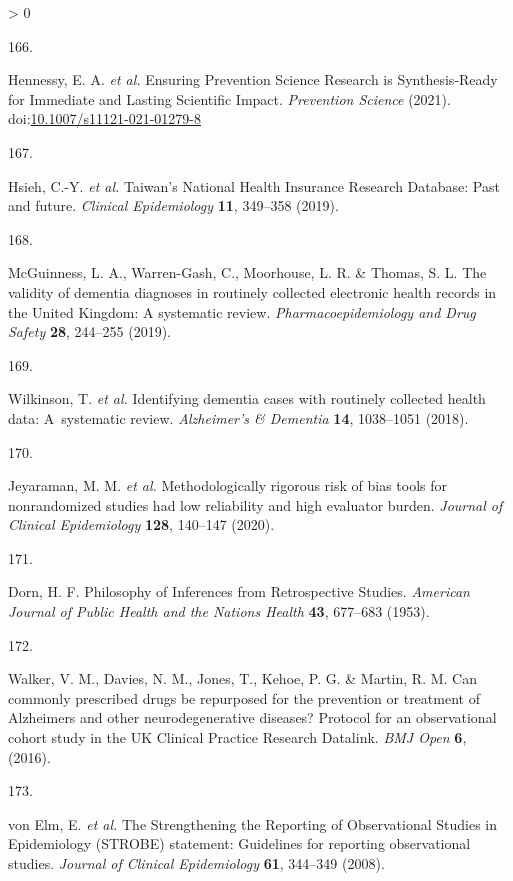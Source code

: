 \documentclass[a4paper, twoside]{templates/ociamthesis}
\newlength{\cslhangindent}
\newlength{\csllabelwidth}
\newenvironment{CSLReferences}[3] %
 {%
  \setlength{\parindent}{0pt}
  \ifodd #1 \everypar{\setlength{\hangindent}{\cslhangindent}}\ignorespaces\fi
  \ifnum #2 > 0
  \setlength{\parskip}{#2\baselineskip}
  \fi
 }%
 {}
\newcommand{\CSLLeftMargin}[1]{\parbox[t]{\maxof{\widthof{#1}}{\csllabelwidth}}{#1}}
\newcommand{\CSLRightInline}[1]{\parbox[t]{\linewidth - \csllabelwidth}{#1}}
\begin{document}
\begin{CSLReferences}{0}{0}
\leavevmode\hypertarget{ref-hennessy2021}{}%
\CSLLeftMargin{166. }
\CSLRightInline{Hennessy, E. A. \emph{et al.} Ensuring {Prevention Science Research} is {Synthesis}-{Ready} for {Immediate} and {Lasting Scientific Impact}. \emph{Prevention Science} (2021). doi:\href{https://doi.org/10.1007/s11121-021-01279-8}{10.1007/s11121-021-01279-8}}

\leavevmode\hypertarget{ref-hsieh2019}{}%
\CSLLeftMargin{167. }
\CSLRightInline{Hsieh, C.-Y. \emph{et al.} Taiwan's {National Health Insurance Research Database}: Past and future. \emph{Clinical Epidemiology} \textbf{11}, 349--358 (2019).}

\leavevmode\hypertarget{ref-mcguinness2019validity}{}%
\CSLLeftMargin{168. }
\CSLRightInline{McGuinness, L. A., Warren-Gash, C., Moorhouse, L. R. \& Thomas, S. L. The validity of dementia diagnoses in routinely collected electronic health records in the {United Kingdom}: {A} systematic review. \emph{Pharmacoepidemiology and Drug Safety} \textbf{28}, 244--255 (2019).}

\leavevmode\hypertarget{ref-wilkinson2018}{}%
\CSLLeftMargin{169. }
\CSLRightInline{Wilkinson, T. \emph{et al.} Identifying dementia cases with routinely collected health data: {A}~systematic review. \emph{Alzheimer's \& Dementia} \textbf{14}, 1038--1051 (2018).}

\leavevmode\hypertarget{ref-jeyaraman2020}{}%
\CSLLeftMargin{170. }
\CSLRightInline{Jeyaraman, M. M. \emph{et al.} Methodologically rigorous risk of bias tools for nonrandomized studies had low reliability and high evaluator burden. \emph{Journal of Clinical Epidemiology} \textbf{128}, 140--147 (2020).}

\leavevmode\hypertarget{ref-dorn1953}{}%
\CSLLeftMargin{171. }
\CSLRightInline{Dorn, H. F. Philosophy of {Inferences} from {Retrospective Studies}. \emph{American Journal of Public Health and the Nations Health} \textbf{43}, 677--683 (1953).}

\leavevmode\hypertarget{ref-walker2016}{}%
\CSLLeftMargin{172. }
\CSLRightInline{Walker, V. M., Davies, N. M., Jones, T., Kehoe, P. G. \& Martin, R. M. Can commonly prescribed drugs be repurposed for the prevention or treatment of {Alzheimers} and other neurodegenerative diseases? {Protocol} for an observational cohort study in the {UK Clinical Practice Research Datalink}. \emph{BMJ Open} \textbf{6}, (2016).}

\leavevmode\hypertarget{ref-vonelm2008}{}%
\CSLLeftMargin{173. }
\CSLRightInline{von Elm, E. \emph{et al.} The {Strengthening} the {Reporting} of {Observational Studies} in {Epidemiology} ({STROBE}) statement: Guidelines for reporting observational studies. \emph{Journal of Clinical Epidemiology} \textbf{61}, 344--349 (2008).}


\end{CSLReferences}
\end{document}
